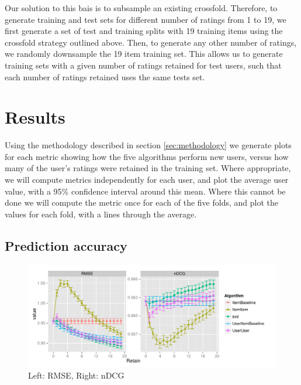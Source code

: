 \documentclass[letterpaper]{sig-alternate}
\begin{document}
  Our solution to this bais is to subsample an existing crossfold.
  Therefore, to generate training and test sets for different number of ratings from 1 to 19, we first generate a set of test and training splits with 19 training items using the crossfold strategy outlined above.
  Then, to generate any other number of ratings, we randomly downsample the 19 item training set.
  This allows us to generate training sets with a given number of ratings retained for test users, such that each number of ratings retained uses the same tests set.

\section{Results}

  Using the methodology described in section \ref{sec:methodology} we generate plots for each metric showing how the five algorithms perform new users, versus how many of the user's ratings were retained in the training set.
  Where appropriate, we will compute metrics independently for each user, and plot the average user value, with a 95\% confidence interval around this mean.
  Where this cannot be done we will compute the metric once for each of the five folds, and plot the values for each fold, with a lines through the average.

\subsection{Prediction accuracy}
\begin{figure}[ht!]
  \centering
  \includegraphics[width=\linewidth]{../lenskit/output/ekstrandTuned20/accuracy.pdf}
  \caption{Left: RMSE, Right: nDCG}
  \label{fig:rmse}
  \label{fig:ndcg}
\end{figure}
\end{document}
